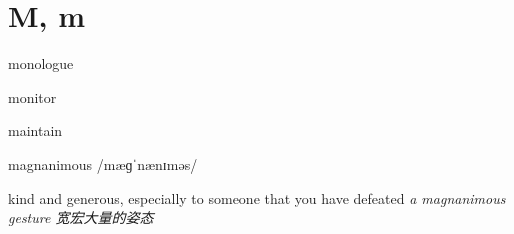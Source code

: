 \section{M, m}

\begin{DefWord}{monologue}
\end{DefWord}

\begin{DefWord}{monitor}
\end{DefWord}

\begin{DefWord}{maintain}
\end{DefWord}

\begin{DefWord}{magnanimous}
    /mæɡˈnænɪməs/

    kind and generous, especially to someone that you have defeated
    \textit{a magnanimous gesture 宽宏大量的姿态}
\end{DefWord}